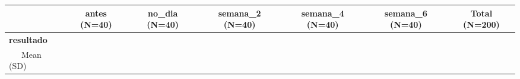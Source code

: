 \documentclass[
]{book}
\begin{document}
\begin{longtable}[]{@{}lcccccc@{}}
\toprule
\begin{minipage}[b]{0.19\columnwidth}\raggedright
\strut
\end{minipage} & \begin{minipage}[b]{0.10\columnwidth}\centering
antes (N=40)\strut
\end{minipage} & \begin{minipage}[b]{0.10\columnwidth}\centering
no\_dia (N=40)\strut
\end{minipage} & \begin{minipage}[b]{0.11\columnwidth}\centering
semana\_2 (N=40)\strut
\end{minipage} & \begin{minipage}[b]{0.11\columnwidth}\centering
semana\_4 (N=40)\strut
\end{minipage} & \begin{minipage}[b]{0.11\columnwidth}\centering
semana\_6 (N=40)\strut
\end{minipage} & \begin{minipage}[b]{0.10\columnwidth}\centering
Total (N=200)\strut
\end{minipage}\tabularnewline
\midrule
\endhead
\begin{minipage}[t]{0.19\columnwidth}\raggedright
\textbf{resultado}\strut
\end{minipage} & \begin{minipage}[t]{0.10\columnwidth}\centering
\strut
\end{minipage} & \begin{minipage}[t]{0.10\columnwidth}\centering
\strut
\end{minipage} & \begin{minipage}[t]{0.11\columnwidth}\centering
\strut
\end{minipage} & \begin{minipage}[t]{0.11\columnwidth}\centering
\strut
\end{minipage} & \begin{minipage}[t]{0.11\columnwidth}\centering
\strut
\end{minipage} & \begin{minipage}[t]{0.10\columnwidth}\centering
\strut
\end{minipage}\tabularnewline
\begin{minipage}[t]{0.19\columnwidth}\raggedright
~~~Mean (SD)\strut
\end{minipage} & \begin{minipage}[t]{0.10\columnwidth}\centering

\end{minipage}
\end{longtable}
\end{document}
